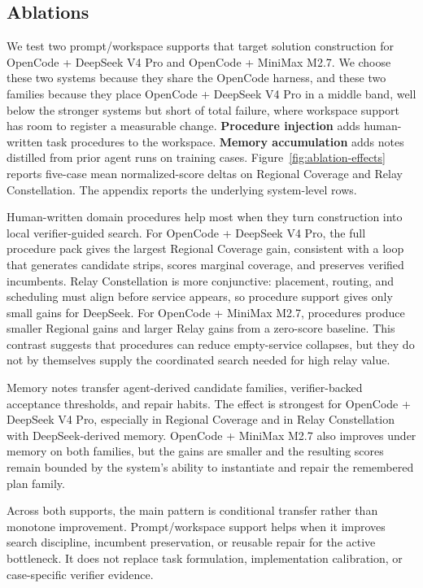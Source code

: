 \documentclass[]{mosi}
\begin{document}
\subsection{Ablations}
\label{sec:ablations}

We test two prompt/workspace supports that target solution construction for OpenCode + DeepSeek V4 Pro and OpenCode + MiniMax M2.7. We choose these two systems because they share the OpenCode harness, and these two families because they place OpenCode + DeepSeek V4 Pro in a middle band, well below the stronger systems but short of total failure, where workspace support has room to register a measurable change. \textbf{Procedure injection} adds human-written task procedures to the workspace. \textbf{Memory accumulation} adds notes distilled from prior agent runs on training cases. Figure~\ref{fig:ablation-effects} reports five-case mean normalized-score deltas on Regional Coverage and Relay Constellation. The appendix reports the underlying system-level rows.

Human-written domain procedures help most when they turn construction into local verifier-guided search. For OpenCode + DeepSeek V4 Pro, the full procedure pack gives the largest Regional Coverage gain, consistent with a loop that generates candidate strips, scores marginal coverage, and preserves verified incumbents. Relay Constellation is more conjunctive: placement, routing, and scheduling must align before service appears, so procedure support gives only small gains for DeepSeek. For OpenCode + MiniMax M2.7, procedures produce smaller Regional gains and larger Relay gains from a zero-score baseline. This contrast suggests that procedures can reduce empty-service collapses, but they do not by themselves supply the coordinated search needed for high relay value.

Memory notes transfer agent-derived candidate families, verifier-backed acceptance thresholds, and repair habits. The effect is strongest for OpenCode + DeepSeek V4 Pro, especially in Regional Coverage and in Relay Constellation with DeepSeek-derived memory. OpenCode + MiniMax M2.7 also improves under memory on both families, but the gains are smaller and the resulting scores remain bounded by the system's ability to instantiate and repair the remembered plan family.

\begin{sloppypar}
Across both supports, the main pattern is conditional transfer rather than monotone improvement. Prompt/workspace support helps when it improves search discipline, incumbent preservation, or reusable repair for the active bottleneck. It does not replace task formulation, implementation calibration, or case-specific verifier evidence.
\end{sloppypar}
\end{document}

